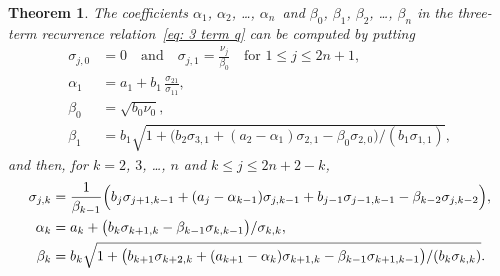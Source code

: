 \documentclass[12pt,a4paper]{article}
\newtheorem{theorem}{Theorem}
\begin{document}
\begin{theorem}
The coefficients $\alpha_1$, $\alpha_2$, \dots, $\alpha_n$~and 
$\beta_0$, $\beta_1$, $\beta_2$, \dots, $\beta_n$ in the three-term 
recurrence relation~\eqref{eq: 3 term q} can be computed by putting
\[
\begin{aligned}
\sigma_{j,0}&=0\quad\text{and}\quad\sigma_{j,1}=\frac{\nu_j}{\beta_0}
	\quad\text{for $1\le j\le2n+1$},\\
\alpha_1&=a_1+b_1\,\frac{\sigma_{21}}{\sigma_{11}},\\
\beta_0&=\sqrt{b_0\nu_0},\\
\beta_1&=b_1\sqrt{1+\bigl(b_2\sigma_{3,1} +(a_2-\alpha_1)\sigma_{2,1}
	-\beta_0\sigma_{2,0}\bigr)/(b_1\sigma_{1,1})},
\end{aligned} 
\]
and then, for $k=2$, $3$, \dots, $n$ and $k\le j\le2n+2-k$,
\[
\begin{aligned}
\sigma_{j,k}&=\frac{1}{\beta_{k-1}}\Bigl(b_j\sigma_{j+1,k-1}
	+(a_j-\alpha_{k-1})\sigma_{j,k-1}+b_{j-1}\sigma_{j-1,k-1}
	-\beta_{k-2}\sigma_{j,k-2}\Bigr),\\
\alpha_k&=a_k+\bigl(b_k\sigma_{k+1,k}
	-\beta_{k-1}\sigma_{k,k-1}\bigr)/\sigma_{k,k},\\
\beta_k&=b_k\sqrt{1+\bigl(b_{k+1}\sigma_{k+2,k}
		+(a_{k+1}-\alpha_k)\sigma_{k+1,k}
		-\beta_{k-1}\sigma_{k+1,k-1}\bigr)/(b_k\sigma_{k,k})}.
\end{aligned}
\]
\end{theorem}
\end{document}
